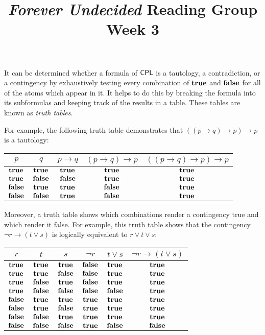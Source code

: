 \documentclass{article}
\title{\emph{Forever Undecided} Reading Group \\ Week 3}
\date{}
\author{}
\begin{document}
\maketitle

It can be determined whether a formula of $\mathsf{CPL}$ is a tautology, a contradiction, or a contingency by exhaustively testing every combination of $\mathbf{true}$ and $\mathbf{false}$ for all of the atoms which appear in it. It helps to do this by breaking the formula into its subformulas and keeping track of the results in a table. These tables are known as \emph{truth tables}.

For example, the following truth table demonstrates that $((p \to q) \to p) \to p$ is a tautology:

\begin{center}
\begin{tabular}{c|c||c|c|c}
    $p$ & $q$ & $p \to q$ & $(p \to q) \to p$ & $((p \to q) \to p) \to p$ \\
    \hline
    $\mathbf{true}$  & $\mathbf{true}$  & $\mathbf{true}$  & $\mathbf{true}$  & $\mathbf{true}$ \\
    $\mathbf{true}$  & $\mathbf{false}$ & $\mathbf{false}$ & $\mathbf{true}$  & $\mathbf{true}$ \\
    $\mathbf{false}$ & $\mathbf{true}$  & $\mathbf{true}$  & $\mathbf{false}$ & $\mathbf{true}$ \\
    $\mathbf{false}$ & $\mathbf{false}$ & $\mathbf{true}$  & $\mathbf{false}$ & $\mathbf{true}$ \\
\end{tabular}
\end{center}

Moreover, a truth table shows which combinations render a contingency true and which render it false. For example, this truth table shows that the contingency $\neg r \to (t \vee s)$ is logically equivalent to $r \vee t \vee s$:

\begin{center}
\begin{tabular}{c|c|c||c|c|c}
    $r$ & $t$ & $s$ & $\neg r$ & $t \vee s$ & $\neg r \to (t \vee s)$ \\
    \hline
    $\mathbf{true}$  & $\mathbf{true}$  & $\mathbf{true}$  & $\mathbf{false}$ & $\mathbf{true}$  & $\mathbf{true}$  \\
    $\mathbf{true}$  & $\mathbf{true}$  & $\mathbf{false}$ & $\mathbf{false}$ & $\mathbf{true}$  & $\mathbf{true}$  \\
    $\mathbf{true}$  & $\mathbf{false}$ & $\mathbf{true}$  & $\mathbf{false}$ & $\mathbf{true}$  & $\mathbf{true}$  \\
    $\mathbf{true}$  & $\mathbf{false}$ & $\mathbf{false}$ & $\mathbf{false}$ & $\mathbf{false}$ & $\mathbf{true}$  \\
    $\mathbf{false}$ & $\mathbf{true}$  & $\mathbf{true}$  & $\mathbf{true}$  & $\mathbf{true}$  & $\mathbf{true}$  \\
    $\mathbf{false}$ & $\mathbf{true}$  & $\mathbf{false}$ & $\mathbf{true}$  & $\mathbf{true}$  & $\mathbf{true}$  \\
    $\mathbf{false}$ & $\mathbf{false}$ & $\mathbf{true}$  & $\mathbf{true}$  & $\mathbf{true}$  & $\mathbf{true}$  \\
    $\mathbf{false}$ & $\mathbf{false}$ & $\mathbf{false}$ & $\mathbf{true}$  & $\mathbf{false}$ & $\mathbf{false}$ \\
\end{tabular}
\end{center}
\end{document}
